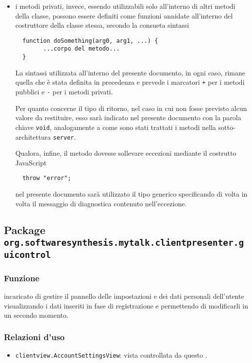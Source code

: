 \begin{description}
\begin{itemize}
\item i metodi privati, invece, essendo utilizzabili solo all'interno di altri metodi della classe, possono essere definiti come funzioni annidate all'interno del costruttore della classe stessa, secondo la consueta sintassi
\begin{verbatim}
  function doSomething(arg0, arg1, ...) {
        ...corpo del metodo...
  }
\end{verbatim}

La sintassi utilizzata all'interno del presente documento, in ogni caso, rimane quella che è stata definita in precedenza e prevede i marcatori \verb|+| per i metodi pubblici e \verb|-| per i metodi privati.

Per quanto concerne il tipo di ritorno, nel caso in cui non fosse previsto alcun valore da restituire, esso sarà indicato nel presente documento con la parola chiave \texttt{void}, analogamente a come sono stati trattati i metodi nella sotto-architettura \texttt{server}.

Qualora, infine, il metodo dovesse sollevare eccezioni mediante il costrutto JavaScript
\begin{verbatim}
  throw "error";
\end{verbatim}
nel presente documento sarà utilizzato il tipo generico  specificando di volta in volta il messaggio di diagnostica contenuto nell'eccezione.

	\end{itemize}
\end{description}

\subsection{Package \texttt{org.softwaresynthesis.mytalk.clientpresenter.guicontrol}}\label{sec:guicontrol}

\subsubsection*{Funzione}
 incaricato di gestire il pannello delle impostazioni e dei dati personali dell'utente visualizzando i dati inseriti in fase di registrazione e permettendo di modificarli in un secondo momento.

\subsubsection*{Relazioni d'uso}
\begin{itemize}
  \item \texttt{clientview.AccountSettingsView}: vista controllata da questo .
\end{itemize}


